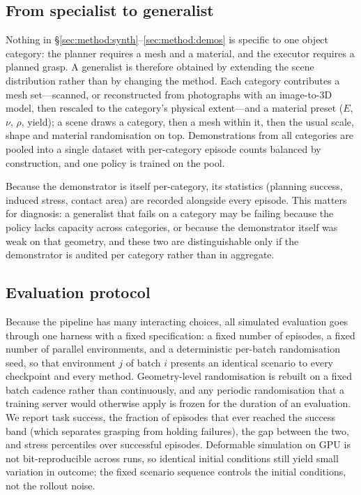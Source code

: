 \subsection{From specialist to generalist}
\label{sec:method:generalist}

Nothing in \S\ref{sec:method:synth}--\ref{sec:method:demos} is specific to one object
category: the planner requires a mesh and a material, and the executor requires a planned
grasp. A generalist is therefore obtained by extending the scene distribution rather than by
changing the method. Each category contributes a mesh set---scanned, or reconstructed from
photographs with an image-to-3D model, then rescaled to the category's physical extent---and a
material preset ($E$, $\nu$, $\rho$, yield); a scene draws a category, then a mesh within it,
then the usual scale, shape and material randomisation on top. Demonstrations from all
categories are pooled into a single dataset with per-category episode counts balanced by
construction, and one policy is trained on the pool.

Because the demonstrator is itself per-category, its statistics (planning success, induced
stress, contact area) are recorded alongside every episode. This matters for diagnosis: a
generalist that fails on a category may be failing because the policy lacks capacity across
categories, or because the demonstrator itself was weak on that geometry, and these two are
distinguishable only if the demonstrator is audited per category rather than in aggregate.

\subsection{Evaluation protocol}
\label{sec:method:eval}

Because the pipeline has many interacting choices, all simulated evaluation goes through one
harness with a fixed specification: a fixed number of episodes, a fixed number of parallel
environments, and a deterministic per-batch randomisation seed, so that environment $j$ of
batch $i$ presents an identical scenario to every checkpoint and every method. Geometry-level
randomisation is rebuilt on a fixed batch cadence rather than continuously, and any periodic
randomisation that a training server would otherwise apply is frozen for the duration of an
evaluation. We report task success, the fraction of episodes that ever reached the success
band (which separates grasping from holding failures), the gap between the two, and stress
percentiles over successful episodes. Deformable simulation on GPU is not bit-reproducible
across runs, so identical initial conditions still yield small variation in outcome; the
fixed scenario sequence controls the initial conditions, not the rollout noise.

